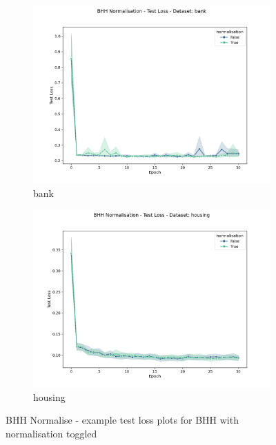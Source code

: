 \begin{figure}[htbp]
	\begin{subfigure}{0.5\textwidth}
    	\centering
        \includegraphics[width=\textwidth]{analysis/bhh_normalise/figures/test/loss/bank.png}
        \caption{bank}
        \label{fig:results:normalise:figures:loss1}
	\end{subfigure}
	\begin{subfigure}{0.5\textwidth}
    	\centering
        \includegraphics[width=\textwidth]{analysis/bhh_normalise/figures/test/loss/housing.png}
        \caption{housing}
        \label{fig:results:normalise:figures:loss2}
	\end{subfigure}
	\caption{\Acs{BHH} Normalise - example test loss plots for \Acs{BHH} with normalisation toggled} 
	\label{fig:results:normalise:figures:loss}
\end{figure}


